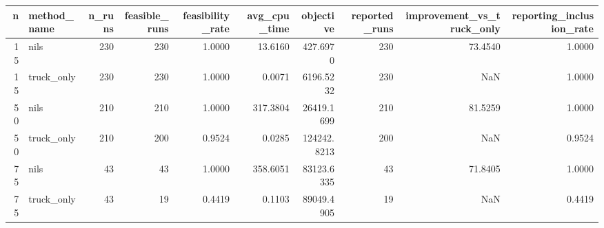 \begin{tabular}{rlrrrrrrrr}
\toprule
n & method_name & n_runs & feasible_runs & feasibility_rate & avg_cpu_time & objective & reported_runs & improvement_vs_truck_only & reporting_inclusion_rate \\
\midrule
15 & nils & 230 & 230 & 1.0000 & 13.6160 & 427.6970 & 230 & 73.4540 & 1.0000 \\
15 & truck_only & 230 & 230 & 1.0000 & 0.0071 & 6196.5232 & 230 & NaN & 1.0000 \\
50 & nils & 210 & 210 & 1.0000 & 317.3804 & 26419.1699 & 210 & 81.5259 & 1.0000 \\
50 & truck_only & 210 & 200 & 0.9524 & 0.0285 & 124242.8213 & 200 & NaN & 0.9524 \\
75 & nils & 43 & 43 & 1.0000 & 358.6051 & 83123.6335 & 43 & 71.8405 & 1.0000 \\
75 & truck_only & 43 & 19 & 0.4419 & 0.1103 & 89049.4905 & 19 & NaN & 0.4419 \\
\bottomrule
\end{tabular}

